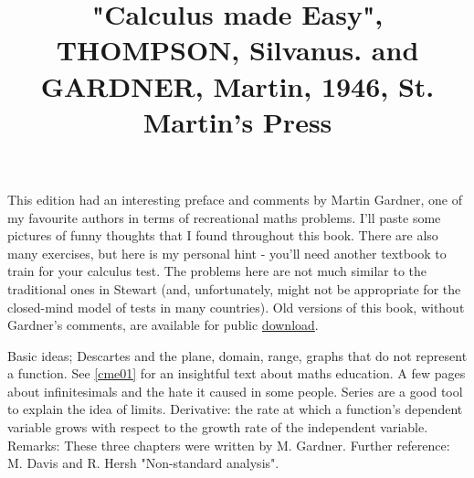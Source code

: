 \documentclass{cornell}
\begin{document}
 

\title{
    \vspace{-3em}
        \begin{tcolorbox}[colframe=white,opacityback=0]
            \begin{tcolorbox}
                \Huge\sffamily "Calculus made Easy", THOMPSON, Silvanus. and GARDNER, Martin, 1946, St. Martin's Press
            \end{tcolorbox}
        \end{tcolorbox}
    \vspace{-3em}
}
\maketitle

\begin{tcolorbox}
\end{tcolorbox}


\noindent
This edition had an interesting preface and comments by Martin Gardner, one of my favourite authors in terms of recreational maths problems. I'll paste some pictures of funny thoughts that I found throughout this book. There are also many exercises, but here is my personal hint - you'll need another textbook to train for your calculus test. The problems here are not much similar to the traditional ones in Stewart (and, unfortunately, might not be appropriate for the closed-mind model of tests in many countries). Old versions of this book, without Gardner's comments, are available for public \href{http://djm.cc/library/Calculus_Made_Easy_Thompson.pdf}{download}.

%
{Basic ideas; Descartes and the plane, domain, range, graphs that do not represent a function. See \ref{cme01} for an insightful text about maths education. A few pages about infinitesimals and the hate it caused in some people. Series are a good tool to explain the idea of limits. Derivative: the rate at which a function's dependent variable grows with respect to the growth rate of the independent variable.}%
{Remarks: These three chapters were written by M. Gardner.}%
{Further reference: M. Davis and R. Hersh "Non-standard analysis". }%
\end{document}
